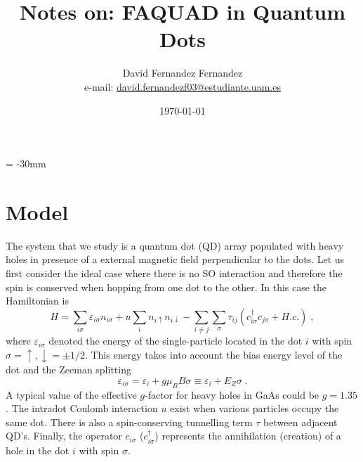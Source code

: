 \documentclass[a4paper,11pt]{article}
\begin{document}
   \droptitle = -30mm
   \title{Notes on: FAQUAD in Quantum Dots}

   \author{David Fernandez Fernandez \\ e-mail: \href{mailto:david.fernandezf03@estudiante.uam.es}{david.fernandezf03@estudiante.uam.es}}
   
   \date{\today}

   \maketitle
   
   \tableofcontents
    

\section{Model}

The system that we study is a quantum dot (QD) array populated with heavy holes in presence of a external magnetic field perpendicular to the dots. Let us first consider the ideal case where there is no SO interaction and therefore the spin is conserved when hopping from one dot to the other. In this case the Hamiltonian is
\begin{equation}
	H=\sum_{i\sigma}\varepsilon_{i\sigma}n_{i\sigma}+u\sum_in_{i\uparrow}n_{i\downarrow}-\sum_{i\neq j}\sum_\sigma\tau_{ij}\left(c_{i\sigma}^\dagger c_{j\sigma}+H.c.\right)\; ,
	\label{eq:Hubbard_model}
\end{equation}
where $\varepsilon_{i\sigma}$ denoted the energy of the single-particle located in the dot $i$ with spin $\sigma=\uparrow,\downarrow=\pm1/2$. This energy takes into account the bias energy level of the dot and the Zeeman splitting
\begin{equation}
	\varepsilon_{i\sigma}=\varepsilon_i+g\mu_B B\sigma\equiv \varepsilon_i+E_Z\sigma\; .
\end{equation}
A typical value of the effective $g$-factor for heavy holes in GaAs could be $g=1.35$. The intradot Coulomb interaction $u$ exist when various particles occupy the same dot. There is also a spin-conserving tunnelling term $\tau$ between adjacent QD's. Finally, the operator $c_{i\sigma}$ ($c_{i\sigma}^{\dagger}$) represents the annihilation (creation) of a hole in the dot $i$ with spin $\sigma$.
\end{document}
